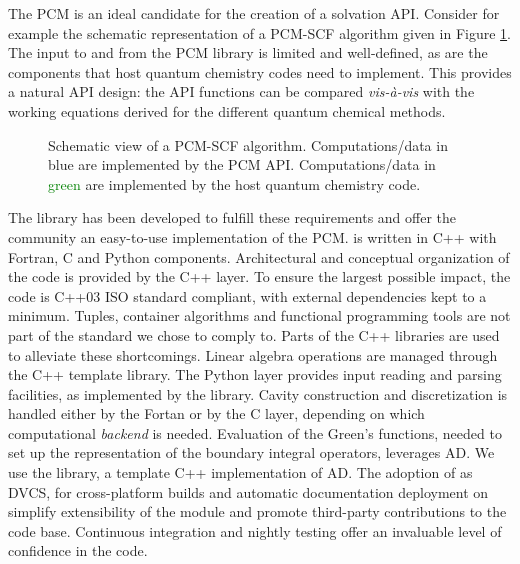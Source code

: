 The \acrshort{PCM} is an ideal candidate for the creation of a solvation
\acrshort{API}. Consider for example the schematic representation of a
\acrshort{PCM}-\acrshort{SCF} algorithm given in Figure \ref{fig:algorithm}.
The input to and from the \acrshort{PCM} library is limited and well-defined,
as are the components that host quantum chemistry codes need to
implement.
This provides a natural \acrshort{API} design: the \acrshort{API} functions can be
compared \emph{vis-à-vis} with the working equations derived for the
different quantum chemical methods.

\begin{figure}[tb]
\centering
\scalebox{0.7}{}
\caption[Modular approach to programming a \acrshort{PCM} functionality into an existing \acrshort{SCF} code.]{
Schematic view of a \acrshort{PCM}-\acrshort{SCF} algorithm. Computations/data in
\textcolor{PMS2229}{blue} are implemented by the \acrshort{PCM} \acrshort{API}.
Computations/data in \textcolor{Green}{green} are implemented by the
host quantum chemistry code.
  }
\label{fig:algorithm}
\end{figure}

The \pcmsolver library has been developed to fulfill these requirements and
offer the community an easy-to-use implementation of the
\acrshort{PCM}.\autocite{PCMSolver}
\pcmsolver is written in C++ with Fortran, C and Python components.
Architectural and conceptual organization of the code is provided by the
C++ layer. To ensure the largest possible impact, the code is C++03 ISO standard
compliant, with external dependencies kept to a minimum.
Tuples, container algorithms and functional programming tools are not
part of the standard we chose to comply to.
Parts of the \Boost C++ libraries are used to alleviate these
shortcomings.\autocite{boost}
Linear algebra operations are managed through the \Eigen C++ template
library.\autocite{eigen}
The Python layer provides input reading and parsing facilities,
as implemented by the \GetKw library.\autocite{libgetkw}
Cavity construction and discretization is handled either by the Fortan
or by the C layer, depending on which computational \emph{backend} is
needed.
Evaluation of the Green's functions, needed to set up the representation
of the boundary integral operators, leverages \gls{AD}. We use the \Taylor library, a template C++
implementation of \acrshort{AD}.\autocite{Bartholomew-Biggs2000-db, libtaylor}
The adoption of \git as \acrshort{DVCS}, \cmake for cross-platform builds and
automatic documentation deployment on \readthedocs simplify
extensibility of the module and promote third-party contributions to the
code base. Continuous integration and nightly testing offer an
invaluable level of confidence in the code.

